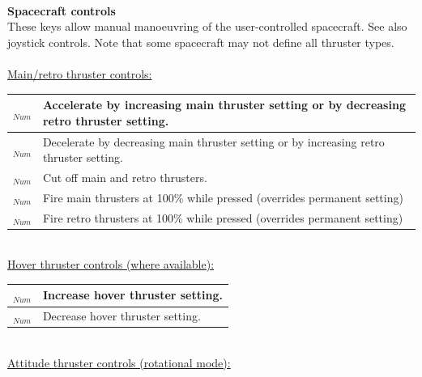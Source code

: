 \documentclass[Orbiter User Manual.tex]{subfiles}
\begin{document}
\noindent
\\
\textbf{Spacecraft controls}\\
These keys allow manual manoeuvring of the user-controlled spacecraft. See also joystick controls. Note that some spacecraft may not define all thruster types.\\
\\
\underline{Main/retro thruster controls:}

	\begin{longtable}{ |p{}|p{}| }
	\hline\rule{0pt}{2ex}
	\Ctrl\keystroke{+}$_{Num}$ & Accelerate by increasing main thruster setting or by decreasing retro thruster setting.\\
	\hline\rule{0pt}{2ex}
	\Ctrl\keystroke{-}$_{Num}$ & Decelerate by decreasing main thruster setting or by increasing retro thruster setting.\\
	\hline\rule{0pt}{2ex}
	\keystroke{*}$_{Num}$ & Cut off main and retro thrusters.\\
	\hline\rule{0pt}{2ex}
	\keystroke{+}$_{Num}$ & Fire main thrusters at 100\% while pressed (overrides permanent setting)\\
	\hline\rule{0pt}{2ex}
	\keystroke{-}$_{Num}$ & Fire retro thrusters at 100\% while pressed (overrides permanent setting)\\
	\hline
	\end{longtable}

\noindent
\\
\underline{Hover thruster controls (where available):}

	\begin{longtable}{ |p{}|p{}| }
	\hline\rule{0pt}{2ex}
	\keystroke{0}$_{Num}$ & Increase hover thruster setting.\\
	\hline\rule{0pt}{2ex}
	\keystroke{.}$_{Num}$ & Decrease hover thruster setting.\\
	\hline
	\end{longtable}

\noindent
\\
\underline{Attitude thruster controls (rotational mode):}
\end{document}

